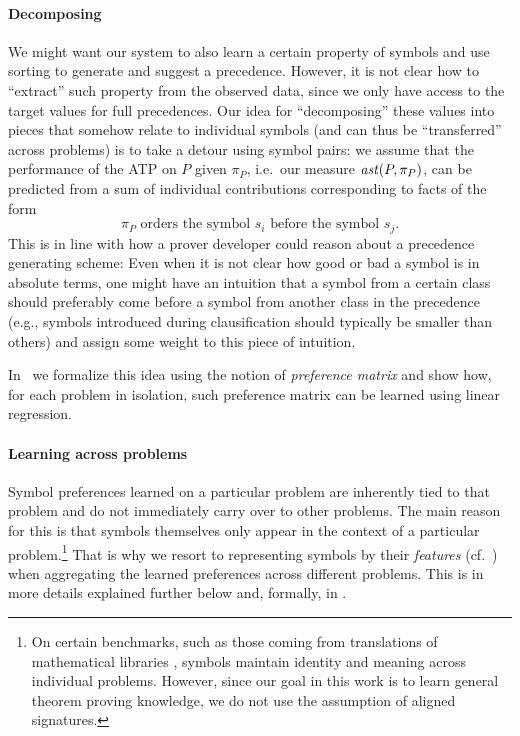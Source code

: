\paragraph{Decomposing}

We might want our system to also learn a certain property of symbols and use sorting to generate and suggest a precedence. 
However, it is not clear how to ``extract'' such property from the observed data, since we only have 
access to the target values for full precedences. Our idea for ``decomposing'' these values into pieces 
that somehow relate to individual symbols (and can thus be ``transferred'' across problems) is to take a detour using symbol pairs:
we assume that the performance of the ATP on \(P\) given \(\pi_P\), i.e.~our measure $\operatorname{\mathit{ast}}(P,\pi_P)$, can be predicted 
from a sum of individual contributions corresponding to facts of the form 
\[\pi_P\text{ orders the symbol }s_i\text{ before the symbol }s_j.\]
This is in line with how a prover developer could reason about a precedence generating scheme:
Even when it is not clear how good or bad a symbol is in absolute terms,
one might have an intuition that a symbol from a certain class should preferably 
come before a symbol from another class in the precedence  
(e.g., symbols introduced during clausification should typically be smaller than others)
and assign some weight to this piece of intuition. 

In~ we formalize this idea using the notion of \emph{preference matrix}
and show how, for each problem in isolation, such preference matrix can be learned using linear regression.

\paragraph{Learning across problems}
Symbol preferences learned on a particular problem are inherently tied to that problem
and do not immediately carry over to other problems. The main reason for this 
is that symbols themselves only appear in the context of a particular problem.\footnote{On certain benchmarks, such as those coming from translations of mathematical libraries \cite{KaliszykU13b},
symbols maintain identity and meaning across individual problems. However, since our goal in this work
is to learn general theorem proving knowledge, we do not use the assumption of aligned signatures.}
That is why we resort to representing symbols by their \emph{features} (cf.~)
when aggregating the learned preferences across different problems.
This is in more details explained further below and, formally, in .

